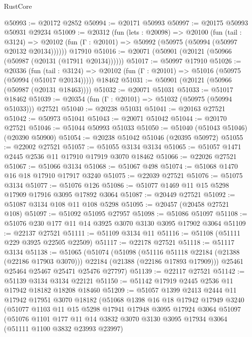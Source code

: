 \begin{lexlean}{RustCore}
\begin{coremodule}
@50993 := @20172 @2852
@50994 := @20171 @50993
@50997 := @20175 @50993 @50931 @29234
@51009 := @20312
    (fun (lets : @20098) =>
    @20100
      (fun (tail : @3124) =>
      @20102 (fun (Γ : @20101) => @50992 (@50975 (@50994 (@50997 @20132 @20134))))))
    @17910
@51016 := @20071 (@50901 (@20121 (@50966 (@50987 (@20131 (@17911 @20134))))))
@51017 := @50997 @17910
@51026 := @20336
    (fun (tail : @3124) => @20102 (fun (Γ : @20101) => @51016 (@50975 (@50994 (@51017 @20134)))))
    @18462
@51031 := @50901 (@20121 (@50966 (@50987 (@20131 @18463))))
@51032 := @20071 @51031
@51033 := @51017 @18462
@51039 := @20354 (fun (Γ : @20101) => @51032 (@50975 (@50994 @51033))) @27521
@51040 := @20238 @51031
@51041 := @20163 @27521
@51042 := @50973 @51041
@51043 := @20071 @51042
@51044 := @20170 @27521
@51046 := @51044 @50993 @51033
@51050 := @51040 (@51043 @51046) (@20390 @50900)
@51054 := @20238 @51042 @51046 (@20395 @50972)
@51055 := @22002 @27521
@51057 := @51055 @3134 @3134
@51065 := @51057 @1471 @2445 @2536 @11 @17910 @17919 @3070 @18462
@51066 := @22026 @27521
@51067 := @51066 @3134
@51068 := @51067 @498
@51074 := @51068 @1470 @16 @18 @17910 @17917 @3240
@51075 := @22039 @27521
@51076 := @51075 @3134
@51077 := @51076 @126
@51086 := @51077 @1469 @11 @15 @5298 @17909 @17916 @3095 @17892 @3064
@51087 := @20449 @27521
@51092 := @51087 @3134 @108 @11 @108 @5298
@51095 := @20457 (@20458 @27521 @108)
@51097 := @51092 @51095 @27957
@51098 := @51086 @51097
@51108 := @51076 @230 @177 @11 @14 @3925 @3070 @3130 @3095 @17902 @3064
@51109 := @22137 @27521
@51111 := @51109 @3134 @11
@51116 := @51108 (@51111 @229 @3925 @22505 @22509)
@51117 := @22178 @27521
@51118 := @51117 @3134
@51138 := @51065
    (@51074
      (@51098
        (@51116 @51118 @22184 (@21388 (@22186 @17903 @3070)))
        @22184
        (@21388 (@22186 @17893 @17909)))
      @25461
      @25464
      @25467
      @25471
      @25476
      @27797)
@51139 := @22117 @27521
@51142 := @51139 @3134 @3134 @22121
@51150 := @51142 @17919 @2445 @2536 @11 @17942 @18182 @18208 @18460
@51209 := @51057
    @1399
    @2413
    @2444
    @11
    @17942
    @17951
    @3070
    @18182
    (@51068
      @1398
      @16
      @18
      @17942
      @17949
      @3240
      (@51077
        @1103
        @11
        @15
        @5298
        @17941
        @17948
        @3095
        @17924
        @3064
        @51097
        (@51076
          @1101
          @177
          @11
          @14
          @3832
          @3070
          @3130
          @3095
          @17934
          @3064
          (@51111 @1100 @3832 @23993 @23997)

\end{coremodule}
\end{lexlean}
